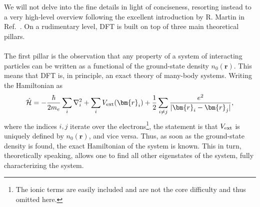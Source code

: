 We will not delve into the fine details in light of conciseness, resorting instead to a very high-level overview following the excellent introduction by R. Martin in Ref.~\cite{Martin2004}.
On a rudimentary level, DFT is built on top of three main theoretical pillars.
\\\\
The first pillar is the observation that any property of a system of interacting particles can be written as a functional of the ground-state density $n_0(\bm{r})$.
This means that DFT is, in principle, an exact theory of many-body systems.
Writing the Hamiltonian as
\begin{equation}
	\hat{\mathcal{H}} = -\frac{\hbar}{2m_e} \sum_i \nabla_i^2 + \sum_i V_{\rm ext}(\bm{r}_i) + \frac{1}{2}\sum_{i\neq j} \frac{e^2}{|\bm{r}_i - \bm{r}_j|},
\end{equation}
where the indices $i,j$ iterate over the electrons\footnote{The ionic terms are easily included and are not the core difficulty and thus omitted here.}, the statement is that $V_{\rm ext}$ is uniquely defined by $n_0(\bm{r})$, and vice versa.
Thus, as soon as the ground-state density is found, the exact Hamiltonian of the system is known.
This in turn, theoretically speaking, allows one to find all other eigenstates of the system, fully characterizing the system.

